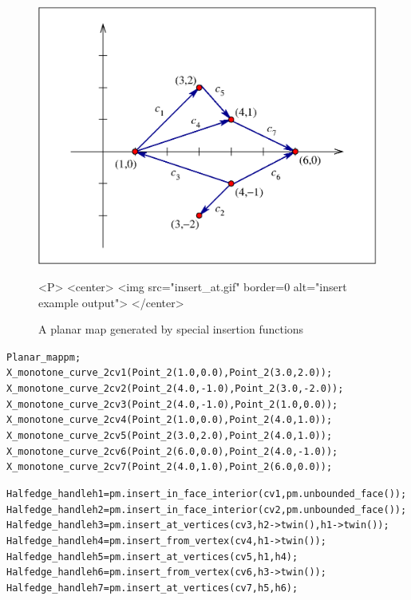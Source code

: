 \begin{figure}[h]
\begin{ccTexOnly}
\centerline{\includegraphics{insert_at.ps}}
\end{ccTexOnly}

\caption{A planar map generated by special insertion functions
\label{PM_sec:insert_at}}

\begin{ccHtmlOnly}
<P>
<center>
  <img src="insert_at.gif"  border=0 alt="insert example output">
</center>
\end{ccHtmlOnly}
\end{figure}

\begin{alltt}
  Planar_map pm;
  X_monotone_curve_2 cv1(Point_2(1.0, 0.0), Point_2(3.0, 2.0));
  X_monotone_curve_2 cv2(Point_2(4.0, -1.0), Point_2(3.0, -2.0));
  X_monotone_curve_2 cv3(Point_2(4.0, -1.0), Point_2(1.0, 0.0));
  X_monotone_curve_2 cv4(Point_2(1.0, 0.0), Point_2(4.0, 1.0));
  X_monotone_curve_2 cv5(Point_2(3.0, 2.0), Point_2(4.0, 1.0));
  X_monotone_curve_2 cv6(Point_2(6.0, 0.0), Point_2(4.0, -1.0));
  X_monotone_curve_2 cv7(Point_2(4.0, 1.0), Point_2(6.0, 0.0));

  Halfedge_handle h1 = pm.insert_in_face_interior(cv1, pm.unbounded_face());
  Halfedge_handle h2 = pm.insert_in_face_interior(cv2, pm.unbounded_face());
  Halfedge_handle h3 = pm.insert_at_vertices(cv3, h2->twin(), h1->twin());
  Halfedge_handle h4 = pm.insert_from_vertex(cv4, h1->twin());
  Halfedge_handle h5 = pm.insert_at_vertices(cv5, h1, h4);
  Halfedge_handle h6 = pm.insert_from_vertex(cv6, h3->twin());
  Halfedge_handle h7 = pm.insert_at_vertices(cv7, h5, h6);
\end{alltt}

